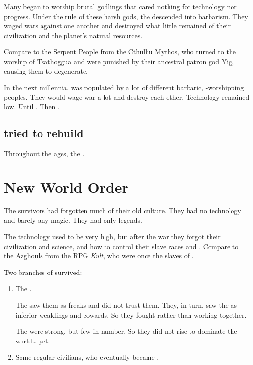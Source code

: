 Many \ophidians began to worship brutal \xs godlings that cared nothing for technology nor progress. 
Under the rule of these harsh gods, the \ophidians descended into barbarism.
They waged wars against one another and destroyed what little remained of their civilization and the planet's natural resources.

Compare to the Serpent People from the Cthulhu Mythos, who turned to the worship of Tsathoggua and were punished by their ancestral patron god Yig, causing them to degenerate. 

In the next millennia, \Miith was populated by a lot of different barbaric, \xs-worshipping peoples. 
They would wage war a lot and destroy each other.
Technology remained low.
Until .
Then . 









\subsection{\Ophidians tried to rebuild}
Throughout the ages, the \ophidians {}.










\section{New World Order}
The survivors had forgotten much of their old culture.
They had no technology and barely any magic. 
They had only legends. 

The technology used to be very high, but after the war they forgot their civilization and science, and how to control their slave races and \daemons. 
Compare to the Azghouls from the RPG \emph{Kult}, who were once the slaves of \humans. 

Two branches of \ophidians{} survived: 

\begin{enumerate}
  \item 
    The \dragons.
    
    The \quiljaaran{} saw them as freaks and did not trust them. 
    They, in turn, saw the \quiljaaran{} as inferior weaklings and cowards. 
    So they fought rather than working together. 
    
    The \dragons{} were strong, but few in number. 
    So they did not rise to dominate the world\ldots{} yet. 
  \item 
    Some regular \ophidian{} civilians, who eventually became \quiljaaran. 
\end{enumerate}









